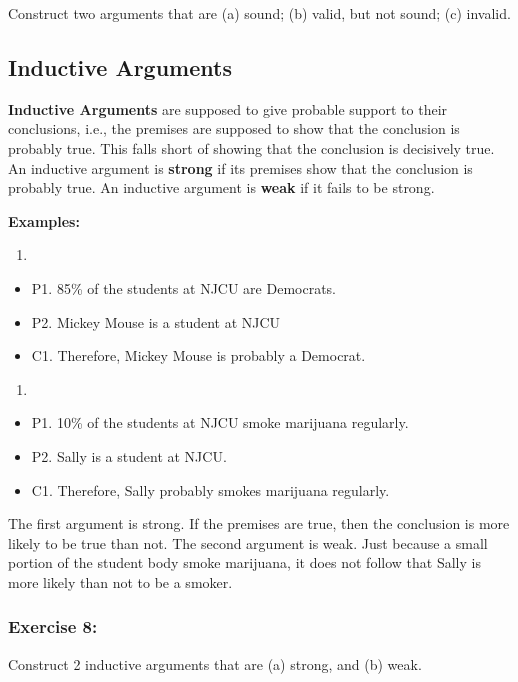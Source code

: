\documentclass[]{article}
\providecommand{\tightlist}{%
  \setlength{\itemsep}{0pt}\setlength{\parskip}{0pt}}
\begin{document}
Construct two arguments that are (a) sound; (b) valid, but not sound;
(c) invalid.

\subsection{Inductive Arguments}\label{inductive-arguments}

\textbf{Inductive Arguments} are supposed to give probable support to
their conclusions, i.e., the premises are supposed to show that the
conclusion is probably true. This falls short of showing that the
conclusion is decisively true. An inductive argument is \textbf{strong}
if its premises show that the conclusion is probably true. An inductive
argument is \textbf{weak} if it fails to be strong.

\textbf{Examples:}

\begin{enumerate}
\def\labelenumi{\arabic{enumi})}
\item
\end{enumerate}

\begin{itemize}
\tightlist
\item
  P1. 85\% of the students at NJCU are Democrats.
\item
  P2. Mickey Mouse is a student at NJCU
\item
  C1. Therefore, Mickey Mouse is probably a Democrat.
\end{itemize}

\begin{enumerate}
\def\labelenumi{\arabic{enumi})}
\setcounter{enumi}{1}
\item
\end{enumerate}

\begin{itemize}
\tightlist
\item
  P1. 10\% of the students at NJCU smoke marijuana regularly.
\item
  P2. Sally is a student at NJCU.
\item
  C1. Therefore, Sally probably smokes marijuana regularly.
\end{itemize}

The first argument is strong. If the premises are true, then the
conclusion is more likely to be true than not. The second argument is
weak. Just because a small portion of the student body smoke marijuana,
it does not follow that Sally is more likely than not to be a smoker.

\subsubsection{Exercise 8:}\label{exercise-8}

Construct 2 inductive arguments that are (a) strong, and (b) weak.
\end{document}
